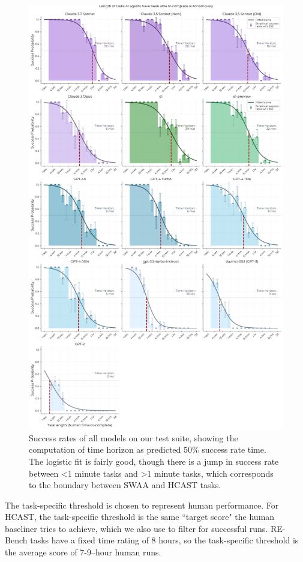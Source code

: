 \documentclass{article}
\newcommand{\gabenchmark}{HCAST}
\begin{document}
\begin{figure}
    \centering
    \includegraphics[width=0.9\linewidth]{plots/individual_histograms/default/histograms.png}
    \caption{Success rates of all models on our test suite, showing the computation of time horizon as predicted 50\% success rate time. The logistic fit is fairly good, though there is a jump in success rate between \textless 1 minute tasks and \textgreater 1 minute tasks, which corresponds to the boundary between SWAA and \gabenchmark{} tasks.}
    \label{fig:hist}
\end{figure}

The task-specific threshold is chosen to represent human performance. For \gabenchmark{}, the task-specific threshold is the same ``target score" the human baseliner tries to achieve, which we also use to filter for successful runs. RE-Bench tasks have a fixed time rating of 8 hours, so the task-specific threshold is the average score of 7-9--hour human runs.
\end{document}
